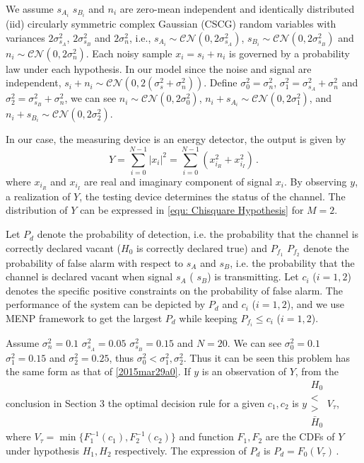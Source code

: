 We assume  $s_{A_i}$ $s_{B_i}$ and $n_i$ are zero-mean independent and identically distributed (iid) circularly symmetric complex Gaussian (CSCG) random variables with variances $2\sigma_{s_A}^2$, $2\sigma_{s_B}^2$ and $2\sigma_{n}^2$, i.e., $s_{A_i} \sim \mathcal{CN}(0, 2\sigma_{s_A}^2)$, $s_{B_i} \sim \mathcal{CN}(0, 2\sigma_{s_B}^2)$ and $n_i \sim \mathcal{CN}(0, 2\sigma_{n}^2)$.
Each noisy sample $x_i = s_i + n_i$ is governed by a probability law under each hypothesis. In our model
since the noise and signal are independent, $s_i+ n_i \sim \mathcal{CN}(0, 2(\sigma_{s}^2 + \sigma_n^2))$.  Define $\sigma_0^2 = \sigma_n^2$, $\sigma_1^2 = \sigma_{s_A}^2 + \sigma_n^2$ and $\sigma_2^2 = \sigma_{s_B}^2 + \sigma_n^2$, we can see
$  n_i \sim \mathcal{CN}(0, 2\sigma_0^2)$, 
$  n_i + s_{A_i} \sim \mathcal{CN}(0, 2\sigma_1^2) $, and 
$   n_i + s_{B_i}\sim \mathcal{CN}(0, 2\sigma_2^2) $.

In our case, the measuring device is an energy detector, the output is given by
\begin{equation} 
  Y = \sum_{i=0}^{N-1}|x_i|^2 = \sum_{i=0}^{N-1}(x_{i_R}^2+x_{i_I}^2)\,.
  \label{equ: testing device}
\end{equation}
where $x_{i_R}$ and $x_{i_I}$ are real and imaginary component of signal $x_i$.
By observing $y$, a realization of $Y$, the testing device determines the status of the channel. 
The distribution of $Y$ can be expressed in \eqref{equ: Chisquare Hypothesis} for $M = 2$. 

Let $P_d$ denote the probability of detection, i.e. the probability that the channel is correctly declared vacant ($H_0$ is correctly declared true) and $P_{f_1}$ $P_{f_2}$ denote the probability of false alarm with respect to $s_A$  and $s_B$, i.e. the probability that the channel is declared vacant when signal $s_A$ ( $s_B$) is transmitting. Let $c_i$ ($i = 1, 2$) denotes the specific positive constraints on the probability of false alarm. The performance of the system can be depicted by $P_d$ and $c_i$ ($i = 1, 2$), and we use MENP framework to get the largest $P_d$ while keeping $P_{f_i  } \leq c_i$ ($i=1, 2$).

Assume $\sigma_n^2=0.1$ $\sigma_{s_A}^2=0.05$ $\sigma_{s_B}^2=0.15$ and $N=20$. We can see $\sigma_0^2=0.1$ $\sigma_1^2=0.15$ and $\sigma_2^2=0.25$, 
thus $\sigma_0^2 < \sigma_1^2, \sigma_2^2$. 
Thus it can be seen this problem has the same form as that of \eqref{2015mar29a0}.  If $y$ is an observation of $Y$, 
from the conclusion in Section 3 the optimal  decision rule for a given $c_1, c_2$ is 
  $y \substack{H_0 \\ < \\ > \\ \bar{H}_0} V_\tau$, 
where $V_\tau = \min\{F_1^{-1}(c_1),  F_2^{-1}(c_2)\}$ and function $F_1,  F_2$ are the CDFs of $Y$ under hypothesis $H_1, H_2$ respectively. The expression of $P_d$ is 
$  P_d = F_0(V_\tau)\,.$

